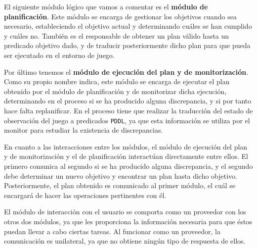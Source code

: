 El siguiente módulo lógico que vamos a comentar es el \textbf{módulo de planificación}.
Este módulo se encarga de gestionar los objetivos cuando sea necesario, estableciendo el
objetivo actual y determinando cuáles se han cumplido y cuáles no. También es el responsable
de obtener un plan válido hasta un predicado objetivo dado, y de traducir posteriormente
dicho plan para que pueda ser ejecutado en el entorno de juego.

Por último tenemos el \textbf{módulo de ejecución del plan y de monitorización}. Como su
propio nombre indica, este módulo se encarga de ejecutar el plan obtenido por el módulo
de planificación y de monitorizar dicha ejecución, determinando en el proceso si se ha
producido alguna discrepancia, y si por tanto hace falta replanificar. En el proceso
tiene que realizar la traducción del estado de observación del juego a predicados
\texttt{PDDL}, ya que esta información se utiliza por el monitor para estudiar la
existencia de discrepancias.

En cuanto a las interacciones entre los módulos, el módulo de ejecución del plan y de
monitorización y el de planificación interactúan directamente entre ellos. El primero
comunica al segundo si se ha producido alguna discrepancia, y el segundo debe determinar
un nuevo objetivo y encontrar un plan hasta dicho objetivo. Posteriormente, el plan obtenido
es comunicado al primer módulo, el cuál se encargará de hacer las operaciones pertinentes
con él.

El módulo de interacción con el usuario se comporta como un proveedor con los otros dos
módulos, ya que les proporciona la información necesaria para que éstos puedan
llevar a cabo ciertas tareas. Al funcionar como un proveedor, la comunicación es unilateral,
ya que no obtiene ningún tipo de respuesta de ellos.
